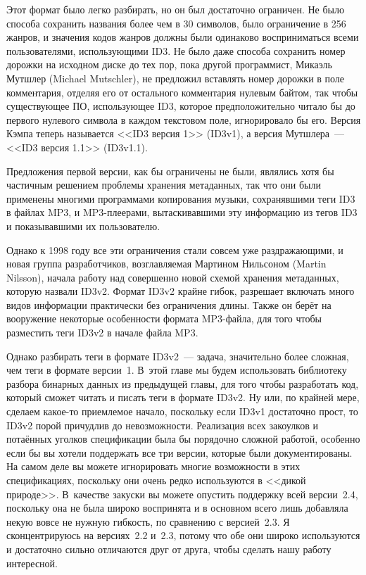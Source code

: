 Этот формат было легко разбирать, но он был достаточно ограничен. Не было способа
сохранить названия более чем в 30 символов, было ограничение в 256 жанров, и значения
кодов жанров должны были одинаково восприниматься всеми пользователями, использующими
ID3. Не было даже способа сохранить номер дорожки на исходном диске до тех пор, пока
другой программист, Микаэль Мутшлер (Michael Mutschler), не предложил вставлять
номер дорожки в поле комментария, отделяя его от остального комментария нулевым байтом,
так чтобы существующее ПО, использующее ID3, которое предположительно читало бы до
первого нулевого символа в каждом текстовом поле, игнорировало бы его. Версия Кэмпа теперь
называется <<ID3 версия 1>> (ID3v1), а версия Мутшлера~--- <<ID3 версия 1.1>> (ID3v1.1).

Предложения первой версии, как бы ограничены не были, являлись хотя бы частичным
решением проблемы хранения метаданных, так что они были применены многими программами
копирования музыки, сохранявшими теги ID3 в файлах MP3, и
MP3-плеерами, вытаскивавшими эту информацию из тегов ID3 и показывавшими их пользователю.

Однако к 1998 году все эти ограничения стали совсем уже раздражающими, и новая группа
разработчиков, возглавляемая Мартином Нильсоном (Martin Nilsson), начала работу
над совершенно новой схемой хранения метаданных, которую назвали ID3v2. Формат ID3v2 крайне гибок,
разрешает включать много видов информации практически без ограничения длины. Также он
берёт на вооружение некоторые особенности формата MP3-файла, для того чтобы разместить
теги ID3v2 в начале файла MP3.

Однако разбирать теги в формате ID3v2~--- задача, значительно более сложная, чем теги в
формате версии~1. В~этой главе мы будем использовать библиотеку разбора бинарных данных из
предыдущей главы, для того чтобы разработать код, который сможет читать и писать теги в
формате ID3v2. Ну или, по крайней мере, сделаем какое-то приемлемое начало, поскольку если
ID3v1 достаточно прост, то ID3v2 порой причудлив до невозможности. Реализация всех
закоулков и потаённых уголков спецификации была бы порядочно сложной работой, особенно
если бы вы хотели поддержать все три версии, которые были документированы. На самом деле
вы можете игнорировать многие возможности в этих спецификациях, поскольку они очень редко
используются в <<дикой природе>>.  В~качестве закуски вы можете опустить поддержку всей
версии~2.4, поскольку она не была широко воспринята и в основном всего лишь добавляла
некую вовсе не нужную гибкость, по сравнению с версией~2.3. Я сконцентрируюсь на версиях~2.2
и~2.3, потому что обе они широко используются и достаточно сильно отличаются друг от
друга, чтобы сделать нашу работу интересной.

